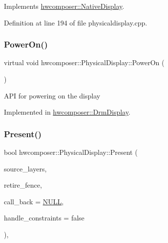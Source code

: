 Implements \mbox{\hyperlink{classhwcomposer_1_1NativeDisplay_af03b22112e421559c5f59837a2209716}{hwcomposer\+::\+Native\+Display}}.



Definition at line 194 of file physicaldisplay.\+cpp.


\begin{DoxyCode}{0}
\end{DoxyCode}
\mbox{\label{classhwcomposer_1_1PhysicalDisplay_a954fbb8be8c69890094ddacc510f4a85}} 
\subsubsection{\texorpdfstring{Power\+On()}{PowerOn()}}
{\footnotesize\ttfamily virtual void hwcomposer\+::\+Physical\+Display\+::\+Power\+On (\begin{DoxyParamCaption}{ }\end{DoxyParamCaption})\hspace{0.3cm}{\ttfamily [pure virtual]}}

A\+PI for powering on the display 

Implemented in \mbox{\hyperlink{classhwcomposer_1_1DrmDisplay_a0212cd45757cc2a74dac62094da103ec}{hwcomposer\+::\+Drm\+Display}}.

\mbox{\label{classhwcomposer_1_1PhysicalDisplay_aafc7fc562c026ce24ac7900c12023bd8}} 
\subsubsection{\texorpdfstring{Present()}{Present()}}
{\footnotesize\ttfamily bool hwcomposer\+::\+Physical\+Display\+::\+Present (\begin{DoxyParamCaption}\item[{std\+::vector$<$ \mbox{\hyperlink{structhwcomposer_1_1HwcLayer}{Hwc\+Layer}} $\ast$$>$ \&}]{source\+\_\+layers,  }\item[{int32\+\_\+t $\ast$}]{retire\+\_\+fence,  }\item[{\mbox{\hyperlink{classhwcomposer_1_1PixelUploaderCallback}{Pixel\+Uploader\+Callback}} $\ast$}]{call\+\_\+back = {\ttfamily \mbox{\hyperlink{alios_2platformdefines_8h_a070d2ce7b6bb7e5c05602aa8c308d0c4}{N\+U\+LL}}},  }\item[{bool}]{handle\+\_\+constraints = {\ttfamily false} }\end{DoxyParamCaption})\hspace{0.3cm}{\ttfamily [override]}, {\ttfamily [virtual]}}

